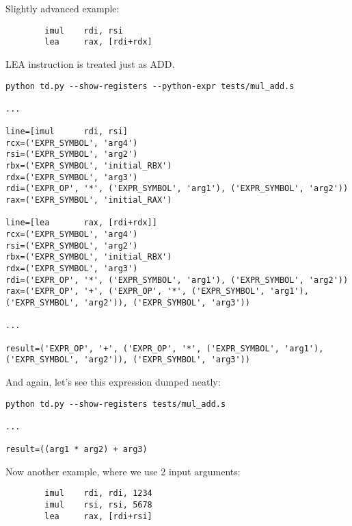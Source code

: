 ﻿\documentclass[12pt]{article}
\begin{document}
Slightly advanced example:

\begin{lstlisting}
        imul    rdi, rsi
        lea     rax, [rdi+rdx]
\end{lstlisting}

LEA instruction is treated just as ADD.

\begin{lstlisting}
python td.py --show-registers --python-expr tests/mul_add.s

...

line=[imul      rdi, rsi]
rcx=('EXPR_SYMBOL', 'arg4')
rsi=('EXPR_SYMBOL', 'arg2')
rbx=('EXPR_SYMBOL', 'initial_RBX')
rdx=('EXPR_SYMBOL', 'arg3')
rdi=('EXPR_OP', '*', ('EXPR_SYMBOL', 'arg1'), ('EXPR_SYMBOL', 'arg2'))
rax=('EXPR_SYMBOL', 'initial_RAX')

line=[lea       rax, [rdi+rdx]]
rcx=('EXPR_SYMBOL', 'arg4')
rsi=('EXPR_SYMBOL', 'arg2')
rbx=('EXPR_SYMBOL', 'initial_RBX')
rdx=('EXPR_SYMBOL', 'arg3')
rdi=('EXPR_OP', '*', ('EXPR_SYMBOL', 'arg1'), ('EXPR_SYMBOL', 'arg2'))
rax=('EXPR_OP', '+', ('EXPR_OP', '*', ('EXPR_SYMBOL', 'arg1'), ('EXPR_SYMBOL', 'arg2')), ('EXPR_SYMBOL', 'arg3'))

...

result=('EXPR_OP', '+', ('EXPR_OP', '*', ('EXPR_SYMBOL', 'arg1'), ('EXPR_SYMBOL', 'arg2')), ('EXPR_SYMBOL', 'arg3'))
\end{lstlisting}

And again, let's see this expression dumped neatly:

\begin{lstlisting}
python td.py --show-registers tests/mul_add.s

...

result=((arg1 * arg2) + arg3)
\end{lstlisting}

Now another example, where we use 2 input arguments:

\begin{lstlisting}
        imul    rdi, rdi, 1234
        imul    rsi, rsi, 5678
        lea     rax, [rdi+rsi]
\end{lstlisting}
\end{document}

